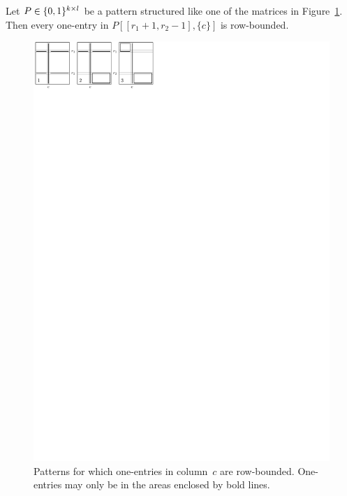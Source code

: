 \begin{lemma}
\label{lemma:I}
Let $P\in\{0,1\}^{k\times l}$ be a pattern structured like one of the matrices in Figure~\ref{fig:lemmaI}. Then every one-entry in $P[[r_1+1,r_2-1],\{c\}]$ is row-bounded.

\begin{figure}[!ht]
\centering
\includegraphics[width=120mm]{img/lemmaI.pdf}
\caption{Patterns for which one-entries in column~$c$ are row-bounded. One-entries may only be in the areas enclosed by bold lines.}
\label{fig:lemmaI}
\end{figure}
\end{lemma}
